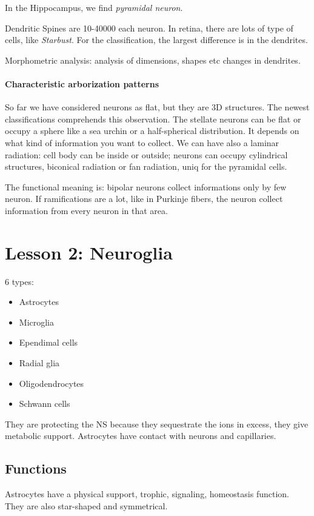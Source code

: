 \documentclass[a4paper, 12pt]{book}
\begin{document}
In the Hippocampus, we find \emph{pyramidal neuron}.  

Dendritic Spines are 10-40000 each neuron. In retina, there are lots of type of cells, like \emph{Starbust}.
For the classification, the largest difference is in the dendrites.

Morphometric analysis: analysis of dimensions, shapes etc changes in dendrites. 

\subsubsection{Characteristic arborization patterns}
So far we have considered neurons as flat, but they are 3D structures. The newest classifications comprehends this observation. The stellate neurons can be flat or occupy a sphere like a sea urchin or a half-spherical distribution. It depends on what kind of information you want to collect. We can have also a laminar radiation: cell body can be inside or outside; neurons can occupy cylindrical structures, biconical radiation or fan radiation, uniq for the pyramidal cells. 

The functional meaning is: bipolar neurons collect informations only by few neuron. If ramifications are a lot, like in Purkinje fibers, the neuron collect information from every neuron in that area. 


\chapter{Lesson 2: Neuroglia}

6 types: 
\begin{itemize}
\item{Astrocytes}
\item{ Microglia}
 \item{Ependimal cells}
 \item{Radial glia}
 \item{Oligodendrocytes}
 \item{Schwann cells} 
\end{itemize}
They are protecting the NS because they sequestrate the ions in excess, they give metabolic support.  Astrocytes have contact with neurons and capillaries. 

\section{Functions}
Astrocytes have a physical support, trophic, signaling, homeostasis function. They are also star-shaped and symmetrical.
\end{document}
